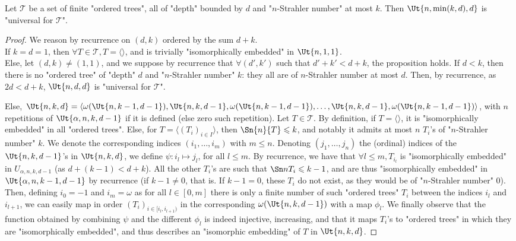\documentclass[a4paper,UKenglish,cleveref, autoref, thm-restate]{lipics-v2021}
\newcommand{\T}{\mathcal{T}}
\renewcommand{\leq}{\leqslant}
\begin{document}
\begin{lemma}\label{lem:Ut-universal}
Let $\T$ be a set of finite "ordered trees", all of "depth" bounded by $d$ and "$n$-Strahler number" at most $k$. Then $\Ut{n,\min(k,d),d}$ is "universal for $\T$".
\end{lemma}
\begin{proof}
We reason by recurrence on $(d,k)$ ordered by the sum $d+k$.\\
If $k = d = 1$, then $\forall T \in \T, T = \langle\rangle$, and is trivially "isomorphically embedded" in $\Ut{n, 1,1}$.\\
Else, let $(d,k) \neq (1,1)$, and we suppose by recurrence that $\forall (d',k')$ such that $d'+k' < d+k$, the proposition holds. If $d<k$, then there is no "ordered tree" of "depth" $d$ and "$n$-Strahler number" $k$: they all are of $n$-Strahler number at most $d$. Then, by recurrence, as $2d < d+k$, $\Ut{n,d,d}$ is "universal for $\T$".

Else, $\Ut{n,k,d} = \langle \omega(\Ut{n,k-1,d-1}), \Ut{n,k,d-1}, \omega(\Ut{n,k-1,d-1}), \dots, \Ut{n,k,d-1}, \omega(\Ut{n,k-1,d-1})\rangle$, with $n$ repetitions of $\Ut{\alpha,n,k,d-1}$ if it is defined (else zero such repetition). Let $T\in \T$. By definition, if $T = \langle\rangle$, it is "isomorphically embedded" in all "ordered trees". Else, for $T = \langle (T_i)_{i\in I}\rangle$, then $\Sn{n}{T}\leq k$, and notably it admits at most $n$ $T_i$'s of "$n$-Strahler number" $k$. We denote the corresponding indices $(i_1, \dots, i_m)$ with $m\leq n$. Denoting $(j_1, \dots, j_n)$ the (ordinal) indices of the $\Ut{n,k,d-1}$'s in  $\Ut{n,k,d}$, we define $\psi: i_l \mapsto j_l$, for all $l\leq m$. By recurrence, we have that $\forall l \leq m, T_{i_l}$ is "isomorphically embedded" in $U_{\alpha,n,k,d-1}$ (as $d+(k-1) < d+k$). All the other $T_i$'s are such that $\Sn n {T_i} \leq k-1$, and are thus "isomorphically embedded" in $\Ut{\alpha,n,k-1,d-1}$ by recurrence (if $k-1 \neq 0$, that is. If $k-1=0$, these $T_i$ do not exist, as they would be of "$n$-Strahler number" $0$). Then, defining $i_0 = -1$ and $i_m = \omega$ as for all $l \in [0,m]$ there is only a finite number of such "ordered trees" $T_i$ between the indices $i_l$ and $i_{l+1}$, we can easily map in order $(T_i)_{i\in [i_l, i_{l+1})}$ in the corresponding $\omega(\Ut{n,k,d-1})$ with a map $\phi_l$. We finally observe that the function obtained by combining $\psi$ and the different $\phi_l$ is indeed injective, increasing, and that it maps $T_i$'s to "ordered trees" in which they are "isomorphically embedded", and thus describes an "isomorphic embedding" of $T$ in $\Ut{n,k,d}$.
\end{proof}
\end{document}
